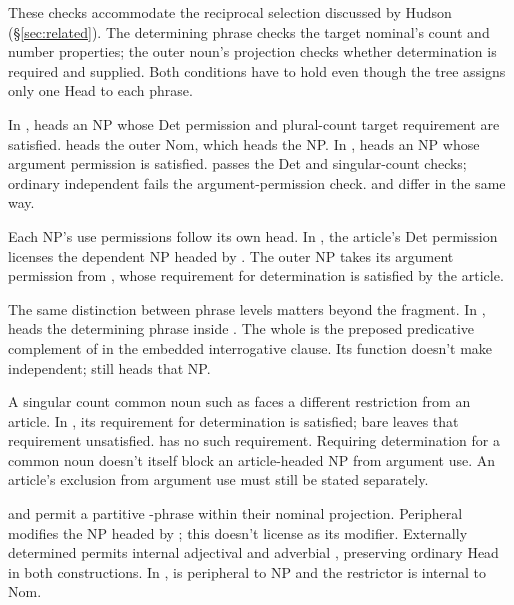 \documentclass[12pt]{article}
\begin{document}
These checks accommodate the reciprocal selection discussed by Hudson (§\ref{sec:related}). The determining phrase checks the target nominal's count and number properties; the outer noun's projection checks whether determination is required and supplied. Both conditions have to hold even though the tree assigns only one Head to each phrase.

In ,  heads an NP whose Det permission and plural-count target requirement are satisfied.  heads the outer Nom, which heads the NP. In ,  heads an NP whose argument permission is satisfied.  passes the Det and singular-count checks; ordinary independent  fails the argument-permission check.  and  differ in the same way.

Each NP's use permissions follow its own head. In , the article's Det permission licenses the dependent NP headed by . The outer NP takes its argument permission from , whose requirement for determination is satisfied by the article.

The same distinction between phrase levels matters beyond the fragment. In ,  heads the determining phrase inside . The whole  is the preposed predicative complement of  in the embedded interrogative clause. Its function doesn't make  independent;  still heads that NP.

A singular count common noun such as  faces a different restriction from an article. In , its requirement for determination is satisfied; bare  leaves that requirement unsatisfied.  has no such requirement. Requiring determination for a common noun doesn't itself block an article-headed NP from argument use. An article's exclusion from argument use must still be stated separately.

 and  permit a partitive -phrase within their nominal projection. Peripheral  modifies the NP headed by ; this doesn't license  as its modifier. Externally determined  permits internal adjectival  and adverbial , preserving ordinary Head in both constructions. In ,  is peripheral to NP and the restrictor  is internal to Nom.
\end{document}
